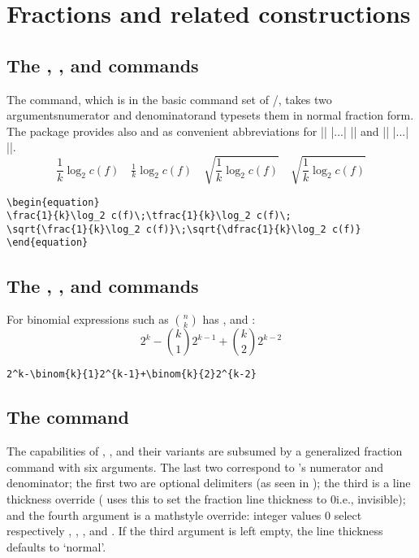 \documentclass[leqno,titlepage,openany]{amsldoc}[1999/12/13]
\begin{document}
\section{Fractions and related constructions}

\subsection{The , , and  commands}

The  command, which is in the basic command set of
\latex/, takes two arguments\mdash numerator and
denominator\mdash and typesets them in normal fraction form. The
 package provides also  and  as
convenient abbreviations for |{\displaystyle\frac| |...| |}|
and\relax
{} |{\textstyle\frac| |...| |}|.
\begin{equation}
\frac{1}{k}\log_2 c(f)\quad\tfrac{1}{k}\log_2 c(f)\quad
\sqrt{\frac{1}{k}\log_2 c(f)}\quad\sqrt{\dfrac{1}{k}\log_2 c(f)}
\end{equation}
\begin{verbatim}
\begin{equation}
\frac{1}{k}\log_2 c(f)\;\tfrac{1}{k}\log_2 c(f)\;
\sqrt{\frac{1}{k}\log_2 c(f)}\;\sqrt{\dfrac{1}{k}\log_2 c(f)}
\end{equation}
\end{verbatim}

\subsection{The , , and  commands}

For binomial expressions such as $\binom{n}{k}$
 has ,  and :
\begin{equation}
2^k-\binom{k}{1}2^{k-1}+\binom{k}{2}2^{k-2}
\end{equation}
\begin{verbatim}
2^k-\binom{k}{1}2^{k-1}+\binom{k}{2}2^{k-2}
\end{verbatim}

\subsection{The  command}

The capabilities of , , and their variants are
subsumed by a generalized fraction command  with six
arguments. The last two correspond to 's numerator and
denominator; the first two are optional delimiters (as seen in
); the third is a line thickness override ( uses
this to set the fraction line thickness to 0\mdash i.e., invisible); and
the fourth argument is a mathstyle override: integer values 0 select
respectively , , , and
. If the third argument is left empty, the line
thickness defaults to `normal'.
\end{document}
